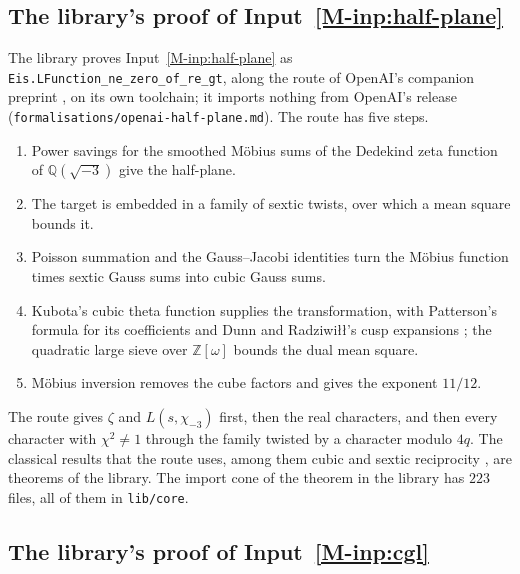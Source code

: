\documentclass[11pt]{article}
\newcommand{\lean}[1]{\texttt{#1}}
\newcommand{\file}[1]{\nolinkurl{#1}}
\numberwithin{equation}{section}
\begin{document}
\subsection*{The library's proof of Input~\ref{M-inp:half-plane}}

The library proves Input~\ref{M-inp:half-plane} as \lean{Eis.LFunction\_ne\_zero\_of\_re\_gt}, along the route of
OpenAI's
companion preprint \cite{openai-companion}, on its own toolchain; it imports nothing from OpenAI's release
(\file{formalisations/openai-half-plane.md}). The route has five steps.
\begin{enumerate}
\item Power savings for the smoothed Möbius sums of the Dedekind zeta function of $\mathbb Q(\sqrt{-3})$ give the
  half-plane.
\item The target is embedded in a family of sextic twists, over which a mean square bounds it.
\item Poisson summation and the Gauss--Jacobi identities turn the Möbius function times sextic Gauss sums into cubic
  Gauss sums.
\item Kubota's cubic theta function \cite{kubota} supplies the transformation, with Patterson's formula for its
  coefficients \cite{patterson} and Dunn and Radziwi\l\l's cusp expansions \cite{dunn-radziwill}; the quadratic large
  sieve over $\mathbb Z[\omega]$ \cite{hb-quadratic, goldmakher-louvel} bounds the dual mean square.
\item Möbius inversion removes the cube factors and gives the exponent $11/12$.
\end{enumerate}
The route gives $\zeta$ and $L(s, \chi_{-3})$ first, then the real characters, and then every character with $\chi^2
\ne 1$
through the family twisted by a character modulo $4q$. The classical results that the route uses,
among them cubic and sextic reciprocity \cite{ireland-rosen}, are theorems of the library. The import cone of the
theorem in the library has $223$ files, all of them in \texttt{lib/core}.

\subsection*{The library's proof of Input~\ref{M-inp:cgl}}
\end{document}
